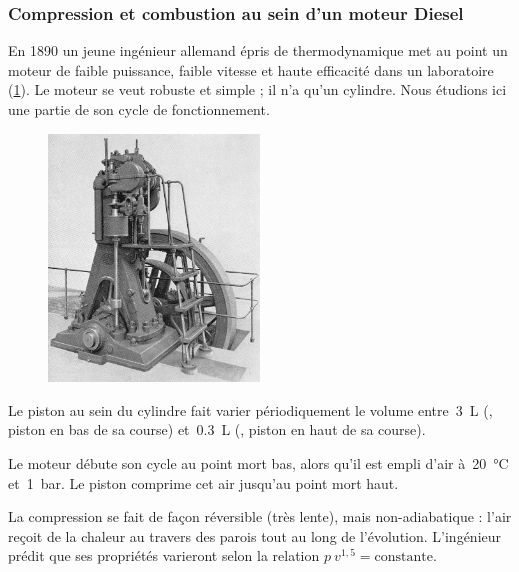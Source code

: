 \subsubsection{Compression et combustion au sein d’un moteur Diesel}
\label{exo_compression_combustion_diesel}

	En 1890 un jeune ingénieur allemand épris de thermodynamique met au point un moteur de faible puissance, faible vitesse et haute efficacité dans un laboratoire (\cref{fig_exo_moteur_diesel}). Le moteur se veut robuste et simple ; il n’a qu’un cylindre. Nous étudions ici une partie de son cycle de fonctionnement. %
	
	\begin{figure}
		\begin{center}
			\includegraphics[width=0.5\textwidth]{images/Dieselmotor_1898_retouched.jpg}
		\end{center}
		\label{fig_exo_moteur_diesel}
	\end{figure}
	
	Le piston au sein du cylindre fait varier périodiquement le volume entre~\SI{3}{\liter} (, piston en bas de sa course) et~\SI{0,3}{\liter} (, piston en haut de sa course).
	
	Le moteur débute son cycle au point mort bas, alors qu’il est empli d’air à~\SI{20}{\degreeCelsius} et~\SI{1}{\bar}. Le piston comprime cet air jusqu’au point mort haut.
	
	La compression se fait de façon réversible (très lente), mais non-adiabatique : l’air reçoit de la chaleur au travers des parois tout au long de l’évolution. L’ingénieur prédit que ses propriétés varieront selon la relation $p \ v^{1,5} = \text{constante}$.


